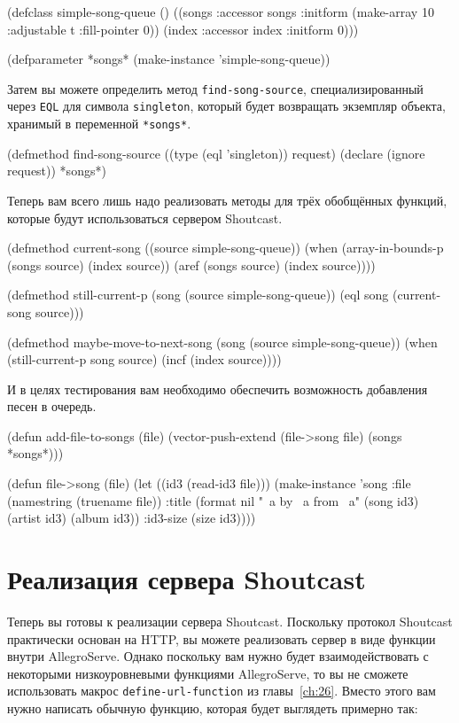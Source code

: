 \begin{myverb}
(defclass simple-song-queue ()
  ((songs :accessor songs :initform (make-array 10 :adjustable t :fill-pointer 0))
   (index :accessor index :initform 0)))

(defparameter *songs* (make-instance 'simple-song-queue))
\end{myverb}

Затем вы можете определить метод \lstinline{find-song-source}, специализированный через
\lstinline{EQL} для символа \lstinline{singleton}, который будет возвращать экземпляр объекта,
хранимый в переменной \lstinline{*songs*}.

\begin{myverb}
(defmethod find-song-source ((type (eql 'singleton)) request)
  (declare (ignore request))
  *songs*)
\end{myverb}

Теперь вам всего лишь надо реализовать методы для трёх обобщённых функций, которые будут
использоваться сервером Shoutcast.

\begin{myverb}
(defmethod current-song ((source simple-song-queue))
  (when (array-in-bounds-p (songs source) (index source))
    (aref (songs source) (index source))))

(defmethod still-current-p (song (source simple-song-queue))
  (eql song (current-song source)))

(defmethod maybe-move-to-next-song (song (source simple-song-queue))
  (when (still-current-p song source)
    (incf (index source))))
\end{myverb}

И в целях тестирования вам необходимо обеспечить возможность добавления песен в очередь.

\begin{myverb}
(defun add-file-to-songs (file)
  (vector-push-extend (file->song file) (songs *songs*)))

(defun file->song (file)
  (let ((id3 (read-id3 file)))
    (make-instance 
     'song
     :file (namestring (truename file))
     :title (format nil "~a by ~a from ~a" (song id3) (artist id3) (album id3))
     :id3-size (size id3))))
\end{myverb}

\section{Реализация сервера Shoutcast}

Теперь вы готовы к реализации сервера Shoutcast. Поскольку протокол Shoutcast практически
основан на HTTP, вы можете реализовать сервер в виде функции внутри AllegroServe.  Однако
поскольку вам нужно будет взаимодействовать с некоторыми низкоуровневыми функциями
AllegroServe, то вы не сможете использовать макрос \lstinline{define-url-function} из
главы~\ref{ch:26}. Вместо этого вам нужно написать обычную функцию, которая будет
выглядеть примерно так:

